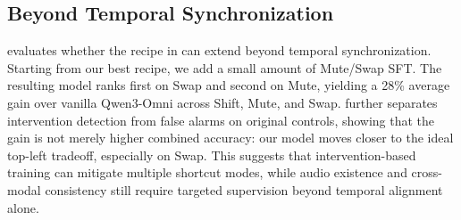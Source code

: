 \vspace{-3pt}
\subsection{Beyond Temporal Synchronization}\label{sec:beyond_temporal}
 evaluates whether the recipe in  can extend beyond temporal synchronization. Starting from our best recipe, we add a small amount of Mute/Swap SFT. The resulting model ranks first on Swap and second on Mute, yielding a 28\% average gain over vanilla Qwen3-Omni across Shift, Mute, and Swap.  further separates intervention detection from false alarms on original controls, showing that the gain is not merely higher combined accuracy: our model moves closer to the ideal top-left tradeoff, especially on Swap. This suggests that intervention-based training can mitigate multiple shortcut modes, while audio existence and cross-modal consistency still require targeted supervision beyond temporal alignment alone.
